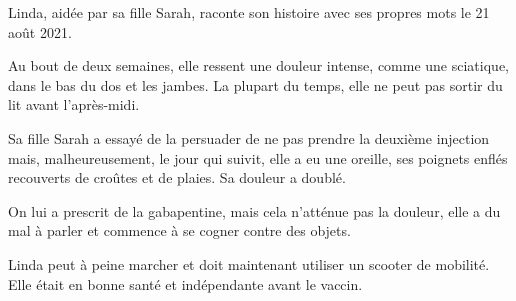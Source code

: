 Linda, aidée par sa fille Sarah, raconte son histoire avec ses propres mots le
21 août 2021.

Au bout de deux semaines, elle ressent une douleur intense, comme une sciatique,
dans le bas du dos et les jambes. La plupart du temps, elle ne peut pas sortir
du lit avant l'après-midi.

Sa fille Sarah a essayé de la persuader de ne pas prendre la deuxième injection
mais, malheureusement, le jour qui suivit, elle a eu une oreille, ses poignets
enflés recouverts de croûtes et de plaies. Sa douleur a doublé.

On lui a prescrit de la gabapentine, mais cela n'atténue pas la douleur, elle a
du mal à parler et commence à se cogner contre des objets.

Linda peut à peine marcher et doit maintenant utiliser un scooter de
mobilité. Elle était en bonne santé et indépendante avant le vaccin.

